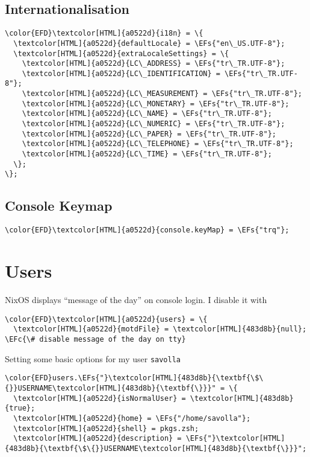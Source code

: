 \documentclass[14pt]{article}
\newcommand{\EFc}[1]{\textcolor{EFc}{#1}} %
\newcommand{\EFs}[1]{\textcolor{EFs}{#1}} %
\begin{document}
\subsection{Internationalisation}
\label{sec:orgd930a3d}
\begin{Code}
\begin{Verbatim}
\color{EFD}\textcolor[HTML]{a0522d}{i18n} = \{
  \textcolor[HTML]{a0522d}{defaultLocale} = \EFs{"en\_US.UTF-8"};
  \textcolor[HTML]{a0522d}{extraLocaleSettings} = \{
    \textcolor[HTML]{a0522d}{LC\_ADDRESS} = \EFs{"tr\_TR.UTF-8"};
    \textcolor[HTML]{a0522d}{LC\_IDENTIFICATION} = \EFs{"tr\_TR.UTF-8"};
    \textcolor[HTML]{a0522d}{LC\_MEASUREMENT} = \EFs{"tr\_TR.UTF-8"};
    \textcolor[HTML]{a0522d}{LC\_MONETARY} = \EFs{"tr\_TR.UTF-8"};
    \textcolor[HTML]{a0522d}{LC\_NAME} = \EFs{"tr\_TR.UTF-8"};
    \textcolor[HTML]{a0522d}{LC\_NUMERIC} = \EFs{"tr\_TR.UTF-8"};
    \textcolor[HTML]{a0522d}{LC\_PAPER} = \EFs{"tr\_TR.UTF-8"};
    \textcolor[HTML]{a0522d}{LC\_TELEPHONE} = \EFs{"tr\_TR.UTF-8"};
    \textcolor[HTML]{a0522d}{LC\_TIME} = \EFs{"tr\_TR.UTF-8"};
  \};
\};
\end{Verbatim}
\end{Code}
\subsection{Console Keymap}
\label{sec:org7ed8aae}
\begin{Code}
\begin{Verbatim}
\color{EFD}\textcolor[HTML]{a0522d}{console.keyMap} = \EFs{"trq"};
\end{Verbatim}
\end{Code}
\section{Users}
\label{sec:org31b4637}
NixOS displays ``message of the day'' on console login. I disable it with
\begin{Code}
\begin{Verbatim}
\color{EFD}\textcolor[HTML]{a0522d}{users} = \{
  \textcolor[HTML]{a0522d}{motdFile} = \textcolor[HTML]{483d8b}{null}; \EFc{\# disable message of the day on tty}
\end{Verbatim}
\end{Code}

Setting some basic options for my user \texttt{savolla}
\begin{Code}
\begin{Verbatim}
\color{EFD}users.\EFs{"}\textcolor[HTML]{483d8b}{\textbf{\$\{}}USERNAME\textcolor[HTML]{483d8b}{\textbf{\}}}" = \{
  \textcolor[HTML]{a0522d}{isNormalUser} = \textcolor[HTML]{483d8b}{true};
  \textcolor[HTML]{a0522d}{home} = \EFs{"/home/savolla"};
  \textcolor[HTML]{a0522d}{shell} = pkgs.zsh;
  \textcolor[HTML]{a0522d}{description} = \EFs{"}\textcolor[HTML]{483d8b}{\textbf{\$\{}}USERNAME\textcolor[HTML]{483d8b}{\textbf{\}}}";
\end{Verbatim}
\end{Code}
\end{document}
